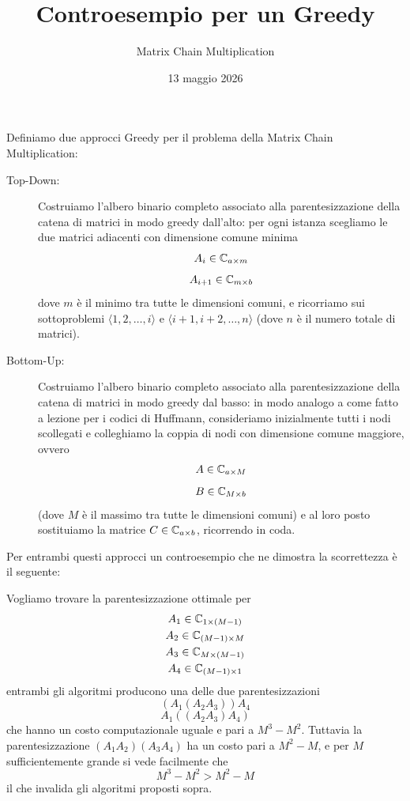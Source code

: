 \documentclass[11pt]{scrartcl}
\begin{document}
	\title{Controesempio per un Greedy}
	\subtitle{Matrix Chain Multiplication}
	\date{13 maggio 2026}
	
	\maketitle
	
	Definiamo due approcci Greedy per il problema della Matrix Chain Multiplication:
	\begin{description}
		\item[Top-Down:] Costruiamo l'albero binario completo associato alla parentesizzazione della catena di matrici in modo greedy dall'alto: per ogni istanza scegliamo le due matrici adiacenti con dimensione comune minima 
		$$A_{i}\in \mathbb C_{a\times m}$$
		$$A_{i+1}\in \mathbb C_{m\times b}$$ 
		dove $m$ è il minimo tra tutte le dimensioni comuni, e ricorriamo sui sottoproblemi $\langle 1,2,\dots,i\rangle$ e $\langle i+1,i+2,\dots,n\rangle$ (dove $n$ è il numero totale di matrici).
		\item[Bottom-Up:] Costruiamo l'albero binario completo associato alla parentesizzazione della catena di matrici in modo greedy dal basso: in modo analogo a come fatto a lezione per i codici di Huffmann, consideriamo inizialmente tutti i nodi scollegati e colleghiamo la coppia di nodi con dimensione comune maggiore, ovvero
		$$A\in \mathbb C_{a\times M}$$
		$$B\in\mathbb C_{M\times b}$$
		(dove $M$ è il massimo tra tutte le dimensioni comuni) e al loro posto sostituiamo la matrice $C\in \mathbb C_{a\times b}$, ricorrendo in coda.
	\end{description}
	Per entrambi questi approcci un controesempio che ne dimostra la scorrettezza è il seguente: 
	\begin{example*}
		Vogliamo trovare la parentesizzazione ottimale per 
		\begin{gather*}
			A_1\in \mathbb C_{1\times (M-1)} \\
			A_2\in \mathbb C_{(M-1)\times M}\\
			A_3\in \mathbb C_{M\times (M-1)}\\
			A_4\in \mathbb C_{(M-1)\times 1}
		\end{gather*}
		entrambi gli algoritmi producono una delle due parentesizzazioni
		$$(A_1(A_2A_3))A_4$$
		$$A_1((A_2A_3)A_4)$$
		che hanno un costo computazionale uguale e pari a $M^3-M^2$. Tuttavia la parentesizzazione $(A_1A_2)(A_3A_4)$ ha un costo pari a $M^2-M$, e per $M$ sufficientemente grande si vede facilmente che
		$$M^3-M^2>M^2-M$$
		il che invalida gli algoritmi proposti sopra.
	\end{example*}
	
	
\end{document}
